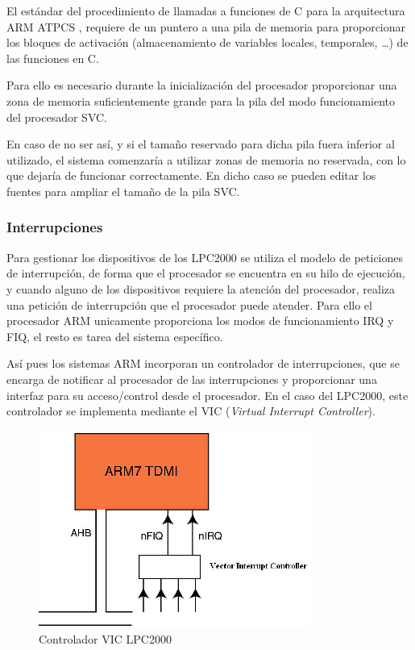 \documentclass[10pt,a4paper]{article}
\begin{document}
	El estándar del procedimiento de llamadas a funciones de C para la arquitectura ARM ATPCS \cite{ATCPS}, requiere de un puntero a una pila de memoria para proporcionar los bloques de activación (almacenamiento de variables locales, temporales, \ldots) de las funciones en C.
	
	Para ello es necesario durante la inicialización del procesador proporcionar una zona de memoria suficientemente grande para la pila del modo funcionamiento del procesador SVC.
	
	En caso de no ser así, y si el tamaño reservado para dicha pila fuera inferior al utilizado, el sistema comenzaría a utilizar zonas de memoria no reservada, con lo que dejaría de funcionar correctamente. En dicho caso se pueden editar los fuentes para ampliar el tamaño de la pila SVC.
	
	\subsubsection{Interrupciones}
	
	Para gestionar los dispositivos de los LPC2000 se utiliza el modelo de peticiones de interrupción, de forma que el procesador se encuentra en su hilo de ejecución, y cuando alguno de los dispositivos requiere la atención del procesador, realiza una petición de interrupción que el procesador puede atender. Para ello el procesador ARM unicamente proporciona los modos de funcionamiento IRQ y FIQ, el resto es tarea del sistema específico.

	Así pues los sistemas ARM incorporan un controlador de interrupciones, que se encarga de notificar al procesador de las interrupciones y proporcionar una interfaz para su acceso/control desde el procesador. En el caso del LPC2000, este controlador se implementa mediante el VIC (\emph{Virtual Interrupt Controller}).
	
	
	\begin{figure}[htbp]
	\begin{center}
	\includegraphics[width = 0.3\columnwidth]{img/lpcvic}
	\end{center}
	
	\caption{Controlador VIC LPC2000}
	\label{fig:lpcvic}
	\end{figure}
	
\end{document}
